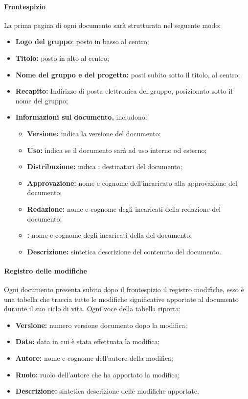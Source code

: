 {\paragraph{Frontespizio}    
La prima pagina di ogni documento sarà strutturata nel seguente modo:
\begin{itemize}
	\item \textbf{Logo del gruppo}: posto in basso al centro;
	\item \textbf{Titolo:} posto in alto al centro;
	\item \textbf{Nome del gruppo e del progetto:} posti subito sotto il titolo, al centro;
	\item \textbf{Recapito:} Indirizzo di posta elettronica del gruppo, posizionato sotto il nome del gruppo;
	\item \textbf{Informazioni sul documento,} includono:
	\begin{itemize}
		\item \textbf{Versione:} indica la versione del documento;
		\item \textbf{Uso:} indica se il documento sarà ad uso interno od esterno;
		\item \textbf{Distribuzione:} indica i destinatari del documento;
		\item \textbf{Approvazione:} nome e cognome dell'incaricato alla approvazione del documento;
		\item \textbf{Redazione:} nome e cognome degli incaricati della redazione del documento;
		\item \textbf{:} nome e cognome degli incaricati della  del documento;
		\item \textbf{Descrizione:} sintetica descrizione del contenuto del documento.
	\end{itemize}
\end{itemize}
\paragraph{Registro delle modifiche}      
Ogni documento presenta subito dopo il frontespizio il registro modifiche, esso è una tabella che traccia tutte le modifiche significative apportate al documento durante il suo ciclo di vita. Ogni voce della tabella riporta:
\begin{itemize}
	\item \textbf{Versione:} numero versione documento dopo la modifica;
	\item \textbf{Data:} data in cui è stata effettuata la modifica;
	\item \textbf{Autore:} nome e cognome dell'autore della modifica;
	\item \textbf{Ruolo:} ruolo dell'autore che ha apportato la modifica;
	\item \textbf{Descrizione:} sintetica descrizione delle modifiche apportate.
\end{itemize}
}
